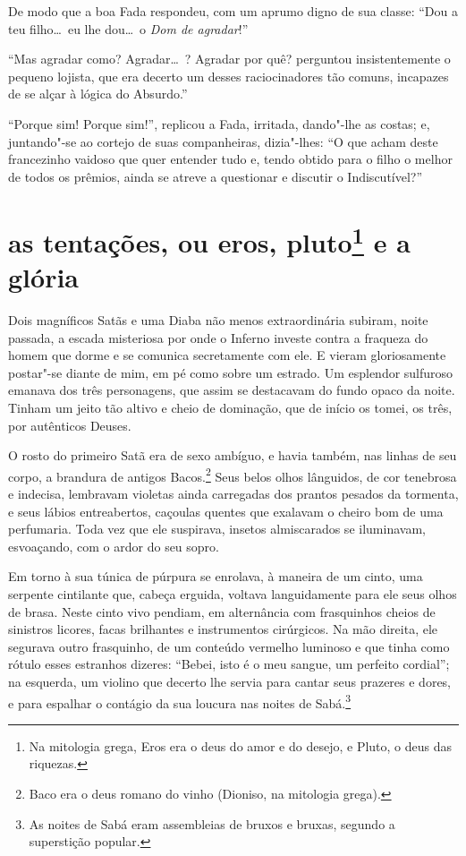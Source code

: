 De modo que a boa Fada respondeu, com um aprumo digno de sua classe:
``Dou a teu filho\ldots\  eu lhe dou\ldots\  o \textit{Dom de
agradar}!''

``Mas agradar como? Agradar\ldots\ ? Agradar por quê? perguntou insistentemente 
o pequeno lojista, que era decerto um desses
raciocinadores tão comuns, incapazes de se alçar à lógica do
Absurdo.''

``Porque sim! Porque sim!'', replicou a Fada,
irritada, dando"-lhe as costas; e, juntando"-se ao cortejo de suas
companheiras, dizia"-lhes: ``O que acham deste
francezinho vaidoso que quer entender tudo e, tendo obtido para o filho o melhor de todos os prêmios, ainda se atreve a questionar e discutir o
Indiscutível?''

\quebra\section[As tentações, ou eros, pluto e a grória]{as tentações, ou eros, pluto\protect\footnote{ Na mitologia 
grega, Eros era o deus do amor e do desejo, e Pluto, o deus das riquezas.} e a glória}

Dois magníficos Satãs e uma Diaba não menos extraordinária subiram,
noite passada, a escada misteriosa por onde o Inferno investe contra a
fraqueza do homem que dorme e se comunica secretamente com ele. E 
vieram gloriosamente postar"-se diante de mim, em pé como sobre um
estrado. Um esplendor sulfuroso emanava dos três personagens, que
assim se destacavam do fundo opaco da noite. Tinham um jeito tão altivo
e cheio de dominação, que de início os tomei, os três, por autênticos Deuses.

O rosto do primeiro Satã era de sexo ambíguo, e havia também, nas linhas
de seu corpo, a brandura de antigos Bacos.\protect\footnote{ Baco era o deus 
romano do vinho (Dioniso, na mitologia grega).}
Seus belos olhos lânguidos, de cor tenebrosa e indecisa, lembravam
violetas ainda carregadas dos prantos pesados da tormenta, e seus
lábios entreabertos, caçoulas quentes que exalavam o cheiro
bom de uma perfumaria. Toda vez que ele suspirava, insetos
almiscarados se iluminavam, esvoaçando, com o ardor do seu sopro.

Em torno à sua túnica de púrpura se enrolava, à maneira de um cinto,
uma serpente cintilante que, cabeça erguida, voltava
languidamente para ele seus olhos de brasa. Neste cinto vivo pendiam, em alternância com frasquinhos cheios de sinistros licores,
facas brilhantes e instrumentos cirúrgicos. Na mão direita, ele segurava
outro frasquinho, de um conteúdo vermelho luminoso e que
tinha como rótulo esses estranhos dizeres: ``Bebei,
isto é o meu sangue, um perfeito cordial''; na esquerda,
um violino que decerto lhe servia para cantar seus prazeres e
dores, e para espalhar o contágio da sua loucura nas noites de
Sabá.\protect\footnote{ As noites de Sabá eram assembleias de bruxos e bruxas, segundo a
superstição popular.}

